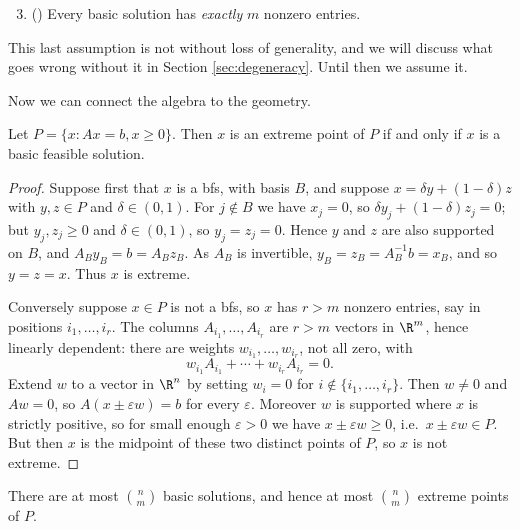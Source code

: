 \documentclass[a4paper]{scrartcl}
\begin{document}
\begin{enumerate}[label=(\Alph*)]
    \setcounter{enumi}{2}
    \item () Every basic solution has \emph{exactly} $m$ nonzero entries.
\end{enumerate}
This last assumption is not without loss of generality, and we will discuss what goes wrong without it in Section \ref{sec:degeneracy}. Until then we assume it.

Now we can connect the algebra to the geometry.

\begin{theorem}
    Let $P = \{x : Ax = b, x \geq 0\}$. Then $x$ is an extreme point of $P$ if and only if $x$ is a basic feasible solution.
\end{theorem}
\begin{proof}
    Suppose first that $x$ is a bfs, with basis $B$, and suppose $x = \delta y + (1 - \delta)z$ with $y, z \in P$ and $\delta \in (0,1)$. For $j \notin B$ we have $x_j = 0$, so $\delta y_j + (1-\delta)z_j = 0$; but $y_j, z_j \geq 0$ and $\delta \in (0,1)$, so $y_j = z_j = 0$. Hence $y$ and $z$ are also supported on $B$, and $A_B y_B = b = A_B z_B$. As $A_B$ is invertible, $y_B = z_B = A_B^{-1}b = x_B$, and so $y = z = x$. Thus $x$ is extreme.

    Conversely suppose $x \in P$ is not a bfs, so $x$ has $r > m$ nonzero entries, say in positions $i_1, \dots, i_r$. The columns $A_{i_1}, \dots, A_{i_r}$ are $r > m$ vectors in $\R^m$, hence linearly dependent: there are weights $w_{i_1}, \dots, w_{i_r}$, not all zero, with
    $$
    w_{i_1}A_{i_1} + \cdots + w_{i_r}A_{i_r} = 0.
    $$
    Extend $w$ to a vector in $\R^n$ by setting $w_i = 0$ for $i \notin \{i_1, \dots, i_r\}$. Then $w \neq 0$ and $Aw = 0$, so $A(x \pm \varepsilon w) = b$ for every $\varepsilon$. Moreover $w$ is supported where $x$ is strictly positive, so for small enough $\varepsilon > 0$ we have $x \pm \varepsilon w \geq 0$, i.e.\ $x \pm \varepsilon w \in P$. But then $x$ is the midpoint of these two distinct points of $P$, so $x$ is not extreme.
\end{proof}

\begin{corollary}
    There are at most $\binom{n}{m}$ basic solutions, and hence at most $\binom{n}{m}$ extreme points of $P$.
\end{corollary}
\end{document}
